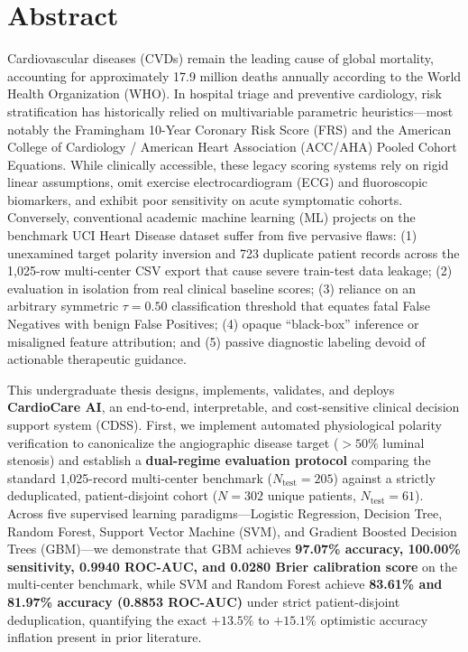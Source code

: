 \documentclass[12pt,a4paper]{report}
\begin{document}
\clearpage
{}

\chapter*{Abstract}

Cardiovascular diseases (CVDs) remain the leading cause of global mortality, accounting for approximately 17.9 million deaths annually according to the World Health Organization (WHO). In hospital triage and preventive cardiology, risk stratification has historically relied on multivariable parametric heuristics---most notably the Framingham 10-Year Coronary Risk Score (FRS) and the American College of Cardiology / American Heart Association (ACC/AHA) Pooled Cohort Equations. While clinically accessible, these legacy scoring systems rely on rigid linear assumptions, omit exercise electrocardiogram (ECG) and fluoroscopic biomarkers, and exhibit poor sensitivity on acute symptomatic cohorts. Conversely, conventional academic machine learning (ML) projects on the benchmark UCI Heart Disease dataset suffer from five pervasive flaws: (1) unexamined target polarity inversion and 723 duplicate patient records across the 1,025-row multi-center CSV export that cause severe train-test data leakage; (2) evaluation in isolation from real clinical baseline scores; (3) reliance on an arbitrary symmetric $\tau=0.50$ classification threshold that equates fatal False Negatives with benign False Positives; (4) opaque ``black-box'' inference or misaligned feature attribution; and (5) passive diagnostic labeling devoid of actionable therapeutic guidance.

This undergraduate thesis designs, implements, validates, and deploys \textbf{CardioCare AI}, an end-to-end, interpretable, and cost-sensitive clinical decision support system (CDSS). First, we implement automated physiological polarity verification to canonicalize the angiographic disease target ($>50\%$ luminal stenosis) and establish a \textbf{dual-regime evaluation protocol} comparing the standard 1,025-record multi-center benchmark ($N_{\text{test}}=205$) against a strictly deduplicated, patient-disjoint cohort ($N=302$ unique patients, $N_{\text{test}}=61$). Across five supervised learning paradigms---Logistic Regression, Decision Tree, Random Forest, Support Vector Machine (SVM), and Gradient Boosted Decision Trees (GBM)---we demonstrate that GBM achieves \textbf{97.07\% accuracy, 100.00\% sensitivity, 0.9940 ROC-AUC, and 0.0280 Brier calibration score} on the multi-center benchmark, while SVM and Random Forest achieve \textbf{83.61\% and 81.97\% accuracy (0.8853 ROC-AUC)} under strict patient-disjoint deduplication, quantifying the exact $+13.5\%$ to $+15.1\%$ optimistic accuracy inflation present in prior literature.
\end{document}
